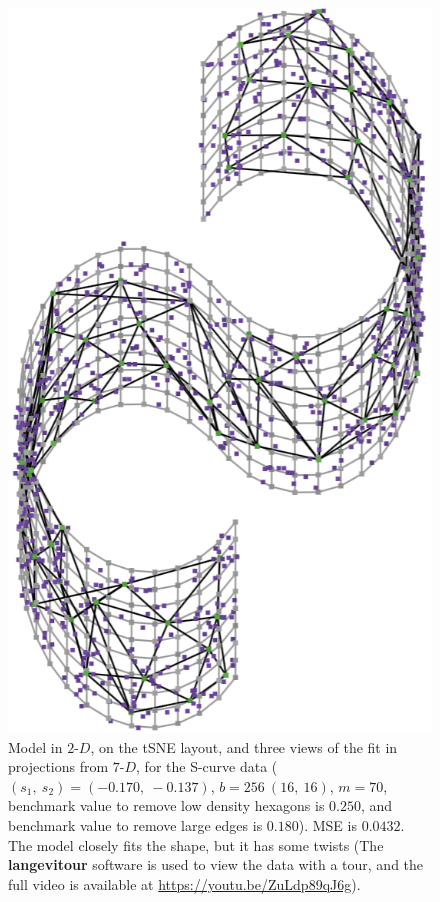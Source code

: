 \documentclass[
  12pt]{article}
\newcommand\gD{$2\text{-}D$}
\begin{document}
\begin{figure}[H]
%
\begin{minipage}{0.25\linewidth}
\includegraphics{figures/scurve/sc_tsne_best_3.png}\end{minipage}%

\caption{\label{fig-scurve-sc-best}Model in \gD{}, on the tSNE layout,
and three views of the fit in projections from \(7\text{-}D\), for the
S-curve data (\((s_1, \ s_2) = (-0.170, \ -0.137)\),
\(b = 256 \  (16, \ 16)\), \(m = 70\), benchmark value to remove low
density hexagons is \(0.250\), and benchmark value to remove large edges
is \(0.180\)). MSE is \(0.0432\). The model closely fits the shape, but
it has some twists (The \textbf{langevitour} software is used to view
the data with a tour, and the full video is available at
\url{https://youtu.be/ZuLdp89qJ6g}).}

\end{figure}%
\end{document}
